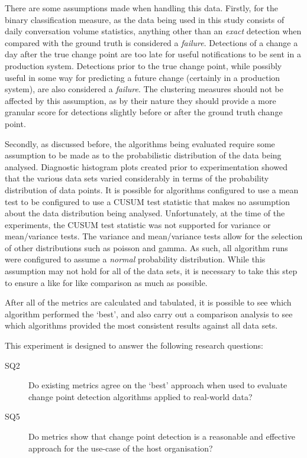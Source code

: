 \documentclass[../main.tex]{subfiles}
\begin{document}
There are some assumptions made when handling this data. Firstly, for the binary classification measure, as the data being used in this study consists of daily conversation volume statistics, anything other than an \emph{exact} detection when compared with the ground truth is considered a \emph{failure}. Detections of a change a day after the true change point are too late for useful notifications to be sent in a production system. Detections prior to the true change point, while possibly useful in some way for predicting a future change (certainly in a production system), are also considered a \emph{failure}. The clustering measures should not be affected by this assumption, as by their nature they should provide a more granular score for detections slightly before or after the ground truth change point.

Secondly, as discussed before, the algorithms being evaluated require some assumption to be made as to the probabilistic distribution of the data being analysed. Diagnostic histogram plots created prior to experimentation showed that the various data sets varied considerably in terms of the probability distribution of data points. It is possible for algorithms configured to use a mean test to be configured to use a CUSUM test statistic that makes no assumption about the data distribution being analysed. Unfortunately, at the time of the experiments, the CUSUM test statistic was not supported for variance or mean/variance tests. The variance and mean/variance tests allow for the selection of other distributions such as poisson and gamma. As such, all algorithm runs were configured to assume a \emph{normal} probability distribution. While this assumption may not hold for all of the data sets, it is necessary to take this step to ensure a like for like comparison as much as possible.

After all of the metrics are calculated and tabulated, it is possible to see which algorithm performed the `best', and also carry out a comparison analysis to see which algorithms provided the most consistent results against all data sets.

This experiment is designed to answer the following research questions:

\begin{description}
    \item[SQ2] Do existing metrics agree on the `best' approach when used to evaluate change point detection algorithms applied to real-world data?
    \item[SQ5] Do metrics show that change point detection is a reasonable and effective approach for the use-case of the host organisation?
\end{description}
\end{document}
